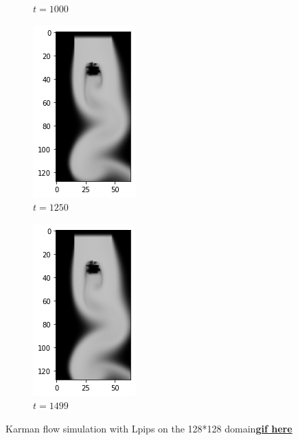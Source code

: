 \documentclass[a4paper,12pt,twoside]{report}
\begin{document}
\begin{figure}
\begin{subfigure}{0.18\textwidth}
		\caption{$t=1000$}
	\end{subfigure}
	\begin{subfigure}{0.18\textwidth}
		\centering
		\includegraphics[scale=0.5]{karmanflow/lpips_density_001250.png}
		\caption{$t=1250$}
	\end{subfigure}
	\begin{subfigure}{0.18\textwidth}
		\centering
		\includegraphics[scale=0.5]{karmanflow/lpips_density_001499.png}
		\caption{$t=1499$}
	\end{subfigure}
	\caption{Karman flow simulation with Lpips on the 128*128 domain\href{https://github.com/w191444052/sol-data/blob/master/karman_high/lpips.gif}{\bf{gif here}}}
	\label{sol karman high lpips}
\end{figure}
\end{document}
